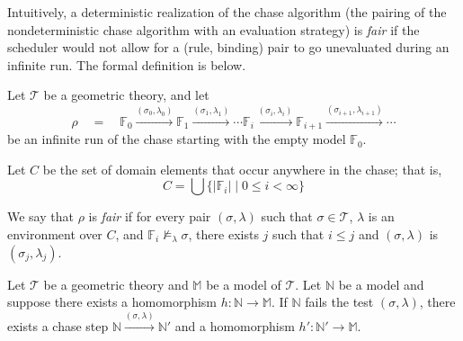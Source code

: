 		\label{fairness_definition}
		Intuitively, a deterministic realization of the chase algorithm (the
		pairing of the nondeterministic chase algorithm with an evaluation
		strategy) is \emph{fair} if the scheduler would not allow for a (rule,
		binding) pair to go unevaluated during an infinite run. The formal
		definition is below.

		\begin{definition}
		Let $\mathcal{T}$ be a geometric theory, and let
			\[
			\rho \quad = \quad \mathbb{F}_0 \xrightarrow{(\sigma_0,\lambda_0)}
			\mathbb{F}_1 \xrightarrow{(\sigma_1,\lambda_1)} %
			\cdots \mathbb{F}_{i} \xrightarrow{(\sigma_i,\lambda_i)}
			\mathbb{F}_{i+1} \xrightarrow{(\sigma_{i+1},\lambda_{i+1})} \cdots
			\]
		be an infinite run of the chase starting with the empty model $\mathbb{F}_0$.

		Let $C$ be the set of domain elements that occur anywhere in the chase;
		that is,
			\[
			C = \bigcup \{ | \mathbb{F}_{i} | \mid 0 \leq i < \infty \}
			\]

		We say that $\rho$ is \emph{fair} if for every pair $(\sigma,\lambda)$
		such that $\sigma \in \mathcal{T}$, $\lambda$ is an environment over $C$, and
		$\mathbb{F}_i \not\models_{\lambda} \sigma$, there exists $j$ such that
		$i \leq j$ and $(\sigma,\lambda)$ is $(\sigma_j,\lambda_j)$.
		\end{definition}

		\begin{lemma}
			\label{lemma_chase_step_minimality_preservation}
			Let $\mathcal{T}$ be a geometric theory and $\mathbb{M}$ be a model of $\mathcal{T}$.
			Let $\mathbb{N}$ be a model and suppose there exists a homomorphism
			$h : \mathbb{N} \to \mathbb{M}$. If $\mathbb{N}$ fails the test
			$(\sigma,\lambda)$, there exists a chase step $\mathbb{N}
			\xrightarrow{(\sigma,\lambda)} \mathbb{N}'$ and a homomorphism $h'
			: \mathbb{N}' \to \mathbb{M}$.
		\end{lemma}

